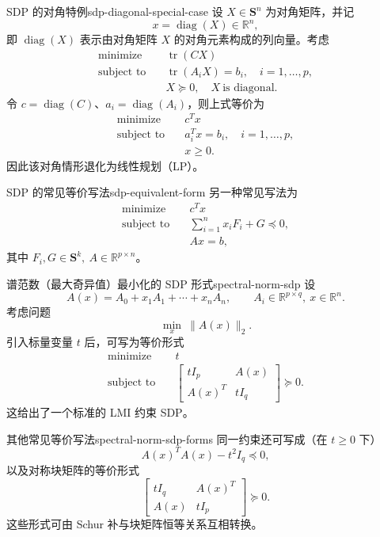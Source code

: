 \documentclass[11pt,a4paper]{article}
\begin{document}
\begin{example}{SDP 的对角特例}{sdp-diagonal-special-case}
设 $X\in\mathbf S^n$ 为对角矩阵，并记
\[
x=\operatorname{diag}(X)\in\mathbb R^n,
\]
即 $\operatorname{diag}(X)$ 表示由对角矩阵 $X$ 的对角元素构成的列向量。考虑
\[
\begin{aligned}
\text{minimize}\quad & \operatorname{tr}(CX)\\
\text{subject to}\quad & \operatorname{tr}(A_iX)=b_i,\quad i=1,\dots,p,\\
& X\succeq0,\quad X\ \text{is diagonal}.
\end{aligned}
\]
令 $c=\operatorname{diag}(C)$、$a_i=\operatorname{diag}(A_i)$，则上式等价为
\[
\begin{aligned}
\text{minimize}\quad & c^Tx\\
\text{subject to}\quad & a_i^Tx=b_i,\quad i=1,\dots,p,\\
& x\ge0.
\end{aligned}
\]
因此该对角情形退化为线性规划（LP）。
\end{example}

\begin{definition}{SDP 的常见等价写法}{sdp-equivalent-form}
另一种常见写法为
\[
\begin{aligned}
\text{minimize}\quad & c^Tx\\
\text{subject to}\quad & \sum_{i=1}^n x_iF_i+G\preceq0,\\
& Ax=b,
\end{aligned}
\]
其中 $F_i,G\in\mathbf S^k,\ A\in\mathbb R^{p\times n}$。
\end{definition}

\begin{example}{谱范数（最大奇异值）最小化的 SDP 形式}{spectral-norm-sdp}
设
\[
A(x)=A_0+x_1A_1+\cdots+x_nA_n,\qquad
A_i\in\mathbb R^{p\times q},\ x\in\mathbb R^n.
\]
考虑问题
\[
\min_{x}\ \|A(x)\|_2.
\]
引入标量变量 $t$ 后，可写为等价形式
\[
\begin{aligned}
\text{minimize}\quad & t\\
\text{subject to}\quad &
\begin{bmatrix}
tI_p & A(x)\\
A(x)^T & tI_q
\end{bmatrix}\succeq0.
\end{aligned}
\]
这给出了一个标准的 LMI 约束 SDP。
\end{example}

\begin{remark}{其他常见等价写法}{spectral-norm-sdp-forms}
同一约束还可写成（在 $t\ge0$ 下）
\[
A(x)^TA(x)-t^2I_q\preceq0,
\]
以及对称块矩阵的等价形式
\[
\begin{bmatrix}
tI_q & A(x)^T\\
A(x) & tI_p
\end{bmatrix}\succeq0.
\]
这些形式可由 Schur 补与块矩阵恒等关系互相转换。
\end{remark}
\end{document}

